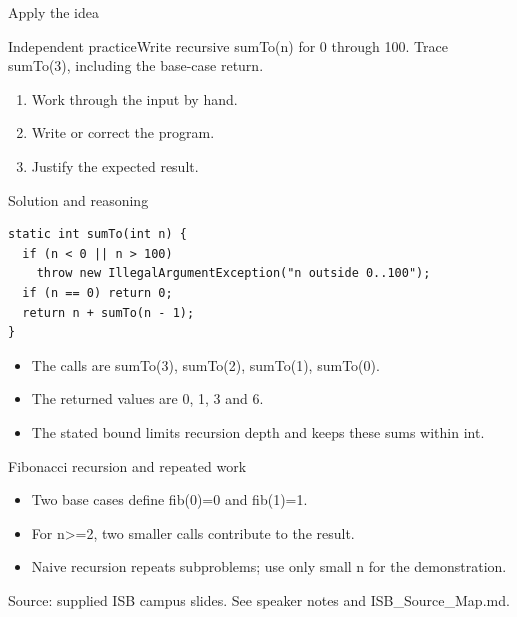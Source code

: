 \documentclass[10pt,aspectratio=169]{beamer}
\begin{document}
\begin{frame}[fragile,t]{Apply the idea}
\begin{alertblock}{Independent practice}Write recursive sumTo(n) for 0 through 100. Trace sumTo(3), including the base-case return.\end{alertblock}\vspace{3mm}\begin{enumerate}\item Work through the input by hand.\item Write or correct the program.\item Justify the expected result.\end{enumerate}
\end{frame}

\begin{frame}[fragile,t]{Solution and reasoning}
\begin{lstlisting}
static int sumTo(int n) {
  if (n < 0 || n > 100)
    throw new IllegalArgumentException("n outside 0..100");
  if (n == 0) return 0;
  return n + sumTo(n - 1);
}
\end{lstlisting}\vspace{1mm}\small\begin{itemize}
\item The calls are sumTo(3), sumTo(2), sumTo(1), sumTo(0).
\item The returned values are 0, 1, 3 and 6.
\item The stated bound limits recursion depth and keeps these sums within int.
\end{itemize}
\end{frame}

\begin{frame}[fragile,t]{Fibonacci recursion and repeated work}
\begin{itemize}
\item Two base cases define fib(0)=0 and fib(1)=1.
\item For n\textgreater{}=2, two smaller calls contribute to the result.
\item Naive recursion repeats subproblems; use only small n for the demonstration.
\end{itemize}
\vspace{3mm}\footnotesize\textcolor{accent}{Source: supplied ISB campus slides. See speaker notes and ISB\_Source\_Map.md.}
\end{frame}
\end{document}
